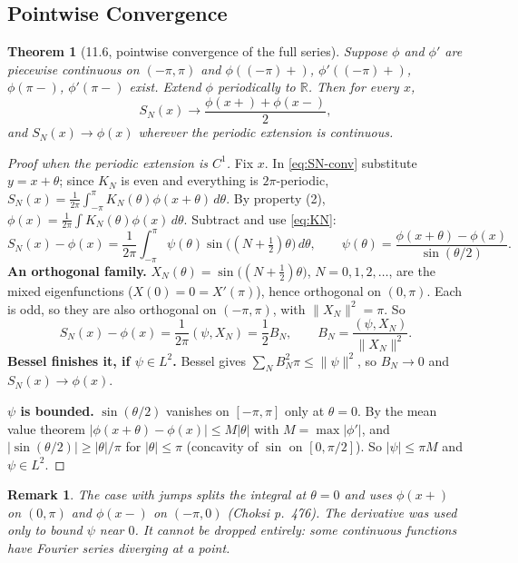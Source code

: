 \documentclass{article}
\newtheorem{theorem}{Theorem}
\newtheorem{remark}{Remark}
\newcommand{\R}{\mathbb{R}}
\begin{document}
\subsection{Pointwise Convergence}
\begin{theorem}[11.6, pointwise convergence of the full series]
    Suppose $\phi$ and $\phi'$ are piecewise continuous on $(-\pi,\pi)$ and $\phi((-\pi)+)$, $\phi'((-\pi)+)$, $\phi(\pi-)$, $\phi'(\pi-)$ exist. Extend $\phi$ periodically to $\R$. Then for every $x$,
    \begin{equation}
        S_N(x) \to \frac{\phi(x+) + \phi(x-)}{2},
    \end{equation}
    and $S_N(x) \to \phi(x)$ wherever the periodic extension is continuous.
\end{theorem}
\begin{proof}[Proof when the periodic extension is $C^1$]
    Fix $x$. In \eqref{eq:SN-conv} substitute $y = x + \theta$; since $K_N$ is even and everything is $2\pi$-periodic, $S_N(x) = \frac{1}{2\pi}\int_{-\pi}^\pi K_N(\theta)\phi(x+\theta)\,d\theta$. By property (2), $\phi(x) = \frac{1}{2\pi}\int K_N(\theta)\phi(x)\,d\theta$. Subtract and use \eqref{eq:KN}:
    \begin{equation}
        S_N(x) - \phi(x) = \frac{1}{2\pi}\int_{-\pi}^\pi\psi(\theta)\sin\big((N+\tfrac12)\theta\big)\,d\theta, \qquad \psi(\theta) = \frac{\phi(x+\theta) - \phi(x)}{\sin(\theta/2)}.
    \end{equation}
    \textbf{An orthogonal family.} $X_N(\theta) = \sin\big((N+\frac12)\theta\big)$, $N = 0, 1, 2, \dots$, are the mixed eigenfunctions ($X(0) = 0 = X'(\pi)$), hence orthogonal on $(0,\pi)$. Each is odd, so they are also orthogonal on $(-\pi,\pi)$, with $\|X_N\|^2 = \pi$. So
    \begin{equation}
        S_N(x) - \phi(x) = \frac{1}{2\pi}(\psi, X_N) = \frac12B_N, \qquad B_N = \frac{(\psi,X_N)}{\|X_N\|^2}.
    \end{equation}
    \textbf{Bessel finishes it, if $\psi \in L^2$.} Bessel gives $\sum_NB_N^2\pi \leq \|\psi\|^2$, so $B_N \to 0$ and $S_N(x) \to \phi(x)$.\par
    \textbf{$\psi$ is bounded.} $\sin(\theta/2)$ vanishes on $[-\pi,\pi]$ only at $\theta = 0$. By the mean value theorem $|\phi(x+\theta) - \phi(x)| \leq M|\theta|$ with $M = \max|\phi'|$, and $|\sin(\theta/2)| \geq |\theta|/\pi$ for $|\theta| \leq \pi$ (concavity of $\sin$ on $[0,\pi/2]$). So $|\psi| \leq \pi M$ and $\psi \in L^2$.
\end{proof}
\begin{remark}
    The case with jumps splits the integral at $\theta = 0$ and uses $\phi(x+)$ on $(0,\pi)$ and $\phi(x-)$ on $(-\pi,0)$ (Choksi p.~476). The derivative was used only to bound $\psi$ near $0$. It cannot be dropped entirely: some continuous functions have Fourier series diverging at a point.
\end{remark}
\end{document}

